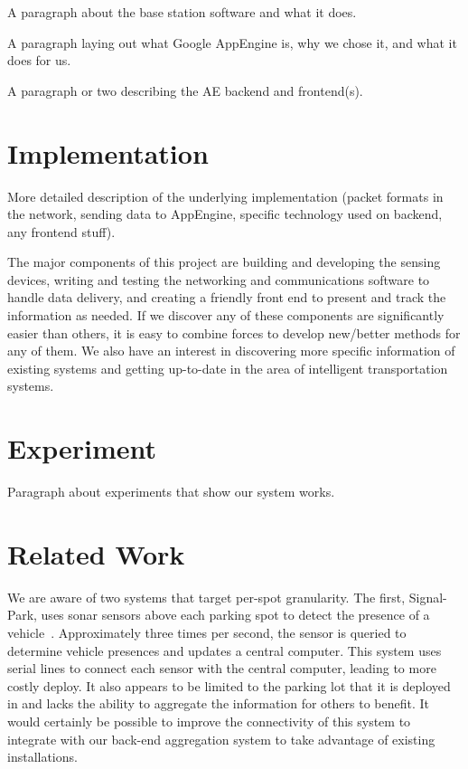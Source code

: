 \documentclass{acm_proc}
\begin{document}
A paragraph about the base station software and what it does.

A paragraph laying out what Google AppEngine is, why we chose it, and what
it does for us.

A paragraph or two describing the AE backend and frontend(s).

\section{Implementation}\label{sec:implementation}

More detailed description of the underlying implementation (packet formats
in the network, sending data to AppEngine, specific technology used on
backend, any frontend stuff).

The major components of this project are building and developing the
sensing
devices, writing and testing the networking and communications
software to handle data delivery, and creating a friendly front end to
present
and track the information as needed.
If we discover any of these components are significantly easier than
others, it
is easy to combine forces to develop new/better methods for any of them.
We also have an interest in discovering more specific information of
existing
systems and getting up-to-date in the area of intelligent transportation
systems.

\section{Experiment}\label{sec:experiment}

Paragraph about experiments that show our system works.

\section{Related Work}\label{sec:related}

We are aware of two systems that target per-spot granularity.
The first, Signal-Park, uses sonar sensors above each parking spot to
detect the presence of a vehicle~\cite{pgi:signal-park}.
Approximately three times per second, the sensor is queried to determine
vehicle presences and updates a central computer.
This system uses serial lines to connect each sensor with the central
computer, leading to more costly deploy.
It also appears to be limited to the parking lot that it is deployed in and
lacks the ability to aggregate the information for others to benefit.
It would certainly be possible to improve the connectivity of this system
to integrate with our back-end aggregation system to take advantage of
existing installations.
\end{document}
